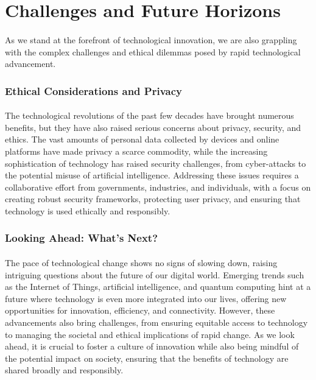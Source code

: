 \documentclass[a4paper,12pt]{book}
\begin{document}
\section*{Challenges and Future Horizons}
\paragraph{}
As we stand at the forefront of technological innovation, we are also grappling with the complex challenges and ethical dilemmas posed by rapid technological advancement.

\subsubsection*{Ethical Considerations and Privacy}
\paragraph{}
The technological revolutions of the past few decades have brought numerous benefits, but they have also raised serious concerns about privacy, security, and ethics. The vast amounts of personal data collected by devices and online platforms have made privacy a scarce commodity, while the increasing sophistication of technology has raised security challenges, from cyber-attacks to the potential misuse of artificial intelligence. Addressing these issues requires a collaborative effort from governments, industries, and individuals, with a focus on creating robust security frameworks, protecting user privacy, and ensuring that technology is used ethically and responsibly.

\subsubsection*{Looking Ahead: What’s Next?}
\paragraph{}
The pace of technological change shows no signs of slowing down, raising intriguing questions about the future of our digital world. Emerging trends such as the Internet of Things, artificial intelligence, and quantum computing hint at a future where technology is even more integrated into our lives, offering new opportunities for innovation, efficiency, and connectivity. However, these advancements also bring challenges, from ensuring equitable access to technology to managing the societal and ethical implications of rapid change. As we look ahead, it is crucial to foster a culture of innovation while also being mindful of the potential impact on society, ensuring that the benefits of technology are shared broadly and responsibly.
\end{document}

